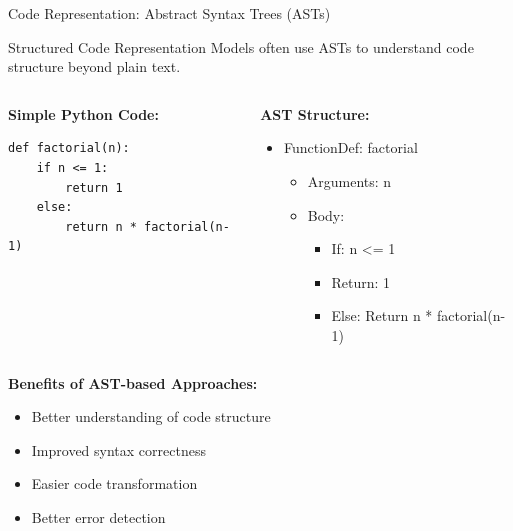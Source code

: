 \documentclass{beamer}
\begin{document}
\begin{frame}[t,fragile]{Code Representation: Abstract Syntax Trees (ASTs)}
    \begin{block}{Structured Code Representation}
        Models often use ASTs to understand code structure beyond plain text.
    \end{block}
    
    \begin{columns}[t]
        \begin{column}{0.5\textwidth}
            \textbf{Simple Python Code:}
            \begin{lstlisting}[style=code, basicstyle=\ttfamily\scriptsize]
def factorial(n):
    if n <= 1:
        return 1
    else:
        return n * factorial(n-1)
            \end{lstlisting}
        \end{column}
        \begin{column}{0.5\textwidth}
            \textbf{AST Structure:}
            \begin{itemize}
                \item FunctionDef: factorial
                \begin{itemize}
                    \item Arguments: n
                    \item Body:
                    \begin{itemize}
                        \item If: n <= 1
                        \item Return: 1
                        \item Else: Return n * factorial(n-1)
                    \end{itemize}
                \end{itemize}
            \end{itemize}
        \end{column}
    \end{columns}
    
    \vspace{0.3cm}
    \textbf{Benefits of AST-based Approaches:}
    \begin{itemize}
        \item Better understanding of code structure
        \item Improved syntax correctness
        \item Easier code transformation
        \item Better error detection
    \end{itemize}
\end{frame}
\end{document}
